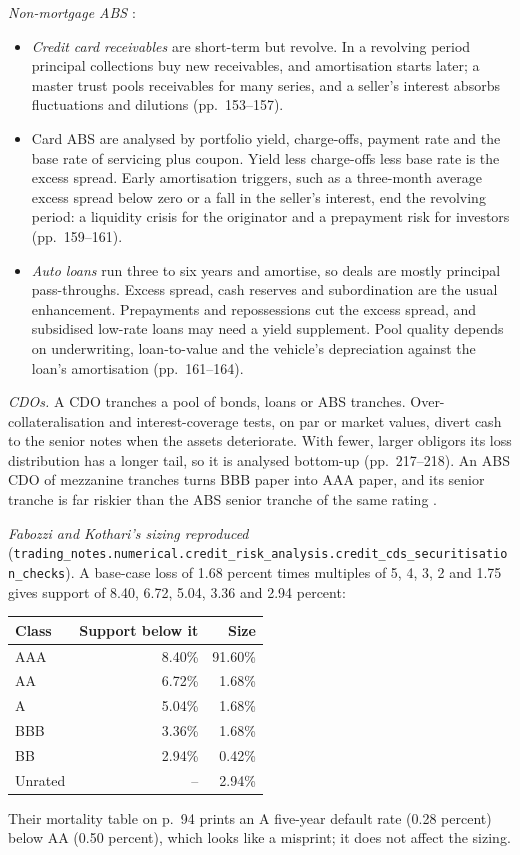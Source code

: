 \begin{qfmethod}
\emph{Non-mortgage ABS} \citep[pp.~153--164]{fabozzi-kothari-securitisation-2008}:
\begin{itemize}
\item \emph{Credit card receivables} are short-term but revolve. In a revolving period principal collections buy new receivables, and amortisation starts later; a master trust pools receivables for many series, and a seller's interest absorbs fluctuations and dilutions (pp.~153--157).
\item Card ABS are analysed by portfolio yield, charge-offs, payment rate and the base rate of servicing plus coupon. Yield less charge-offs less base rate is the excess spread. Early amortisation triggers, such as a three-month average excess spread below zero or a fall in the seller's interest, end the revolving period: a liquidity crisis for the originator and a prepayment risk for investors (pp.~159--161).
\item \emph{Auto loans} run three to six years and amortise, so deals are mostly principal pass-throughs. Excess spread, cash reserves and subordination are the usual enhancement. Prepayments and repossessions cut the excess spread, and subsidised low-rate loans may need a yield supplement. Pool quality depends on underwriting, loan-to-value and the vehicle's depreciation against the loan's amortisation (pp.~161--164).
\end{itemize}

\emph{CDOs.} A CDO tranches a pool of bonds, loans or ABS tranches. Over-collateralisation and interest-coverage tests, on par or market values, divert cash to the senior notes when the assets deteriorate. With fewer, larger obligors its loss distribution has a longer tail, so it is analysed bottom-up (pp.~217--218). An ABS CDO of mezzanine tranches turns BBB paper into AAA paper, and its senior tranche is far riskier than the ABS senior tranche of the same rating \citep[pp.~204--205]{s7-hulloptions}.

 \emph{Fabozzi and Kothari's sizing reproduced} (\nolinkurl{trading_notes.numerical.credit_risk_analysis.credit_cds_securitisation_checks}). A base-case loss of 1.68 percent times multiples of 5, 4, 3, 2 and 1.75 gives support of 8.40, 6.72, 5.04, 3.36 and 2.94 percent:
\begin{center}\small
\begin{tabular}{@{}lrr@{}}
\toprule
Class & Support below it & Size \\
\midrule
AAA & 8.40\% & 91.60\% \\
AA & 6.72\% & 1.68\% \\
A & 5.04\% & 1.68\% \\
BBB & 3.36\% & 1.68\% \\
BB & 2.94\% & 0.42\% \\
Unrated & -- & 2.94\% \\
\bottomrule
\end{tabular}
\end{center}
Their mortality table on p.~94 prints an A five-year default rate (0.28 percent) below AA (0.50 percent), which looks like a misprint; it does not affect the sizing.


\end{qfmethod}

